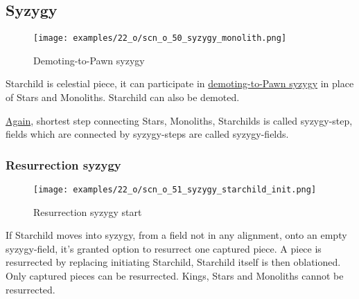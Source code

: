 \clearpage %

\subsection*{Syzygy}
\label{sec:One/Starchild/Syzygy}

\vspace*{-1.4\baselineskip}
\noindent
\begin{figure}[!h]
\texttt{[image: examples/22\_o/scn\_o\_50\_syzygy\_monolith.png]}
\caption{Demoting-to-Pawn syzygy}
\label{fig:scn_o_50_syzygy_monolith}
\end{figure}

Starchild is celestial piece, it can participate in
\hyperref[fig:scn_d_22_syzygy_2_stars_init]{demoting-to-Pawn syzygy} in place of
Stars and Monoliths. Starchild can also be demoted.

\hyperref[fig:scn_d_21_syzygy_explain]{Again}, shortest step connecting
Stars, Monoliths, Starchilds is called syzygy-step, fields which are connected by
syzygy-steps are called syzygy-fields.

\clearpage %

\subsubsection*{Resurrection syzygy}
\label{sec:One/Starchild/Syzygy/Resurrection syzygy}

\vspace*{-1.4\baselineskip}
\noindent
\begin{figure}[!h]
\texttt{[image: examples/22\_o/scn\_o\_51\_syzygy\_starchild\_init.png]}
\caption{Resurrection syzygy start}
\label{fig:scn_o_51_syzygy_starchild_init}
\end{figure}

If Starchild moves into syzygy, from a field not in any alignment, onto an empty
syzygy-field, it's granted option to resurrect one captured piece. A piece is
resurrected by replacing initiating Starchild, Starchild itself is then oblationed.
Only captured pieces can be resurrected. Kings, Stars and Monoliths cannot be
resurrected.

